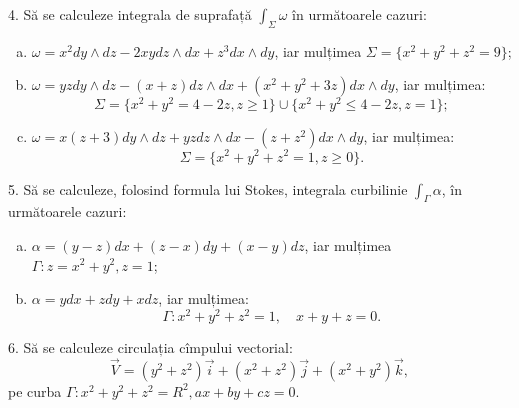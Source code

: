 \documentclass[11pt,a4paper]{article}
\theoremstyle{dotless}
\theoremstyle{dotlessdr}
\begin{document}
\vspace{1cm}

4. Să se calculeze integrala de suprafață $\int_\Sigma \omega$ în următoarele cazuri:
\begin{enumerate}[(a)]
\item $\omega = x^2 dy \wedge dz - 2xy dz \wedge dx + z^3 dx \wedge dy$, iar mulțimea
  $\Sigma = \{x^2 + y^2 + z^2 = 9 \}$;
\item $\omega = yz dy \wedge dz - (x + z) dz \wedge dx + (x^2 + y^2 + 3z) dx \wedge dy$,
  iar mulțimea:
  \[
    \Sigma = \{ x^2 + y^2 = 4 - 2z, z \geq 1 \} \cup \{x^2 + y^2 \leq 4 - 2z, z = 1 \};
  \]
\item $\omega = x(z + 3) dy \wedge dz + yz dz \wedge dx - (z + z^2) dx \wedge dy$,
  iar mulțimea:
  \[
    \Sigma = \{ x^2 + y^2 + z^2 = 1, z \geq 0\}.
  \]
\end{enumerate}

\vspace{1cm}

5. Să se calculeze, folosind formula lui Stokes, integrala curbilinie
$\int_\Gamma \alpha$, în următoarele cazuri:
\begin{enumerate}[(a)]
\item $\alpha = (y - z) dx + (z - x)dy + (x - y) dz$, iar mulțimea $\Gamma: z = x^2 + y^2, z = 1$;
\item $\alpha = ydx + zdy + xdz$, iar mulțimea:
  \[
    \Gamma: x^2 + y^2 + z^2 = 1, \quad x + y + z = 0.
  \]
\end{enumerate}

\vspace{1cm}

6. Să se calculeze circulația cîmpului vectorial:
\[
  \vec{V} = (y^2 + z^2)\vec{i} + (x^2 + z^2)\vec{j} + (x^2 + y^2)\vec{k},
\]
pe curba $\Gamma: x^2 + y^2 + z^2 = R^2, ax + by + cz = 0$.
\end{document}
